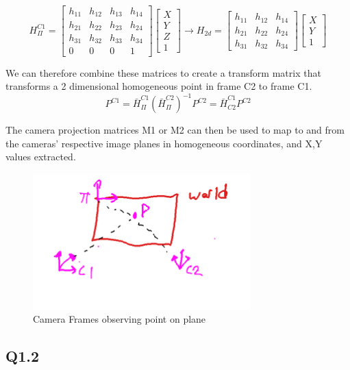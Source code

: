 \documentclass[12pt]{article}
\begin{document}
$$
H_{\Pi}^{C1}=
\begin{bmatrix}
h_{11} & h_{12} & h_{13} & h_{14} \\
h_{21} & h_{22} & h_{23} & h_{24} \\
h_{31} & h_{32} & h_{33} & h_{34} \\
0 & 0 & 0 & 1
\end{bmatrix}
\begin{bmatrix}
X \\ Y \\ Z \\ 1
\end{bmatrix}
\rightarrow
H_{2d}=
\begin{bmatrix}
h_{11} & h_{12} & h_{14} \\
h_{21} & h_{22} & h_{24} \\
h_{31} & h_{32} & h_{34} 
\end{bmatrix}
\begin{bmatrix}
X \\ Y  \\ 1
\end{bmatrix}
$$

We can therefore combine these matrices to create a transform matrix that transforms a 2 dimensional homogeneous point in frame C2 to frame C1.
$$
P^{C1} = 
\bar{H}_{\Pi}^{C1}
(\bar{H}_{\Pi}^{C2})^{-1}
P^{C2}
=
\bar{H}_{C2}^{C1}
P^{C2}
$$

The camera projection matrices M1 or M2 can then be used to map to and from the cameras' respective image planes in homogeneous coordinates, and X,Y values extracted.

\begin{figure}[H]
\centering
\includegraphics[page=1,width=0.75\textwidth]{q1_1a}
\caption{ Camera Frames observing point on plane } 
\label{fig:autoencout}
\end{figure}   


\subsection{Q1.2}
\end{document}
